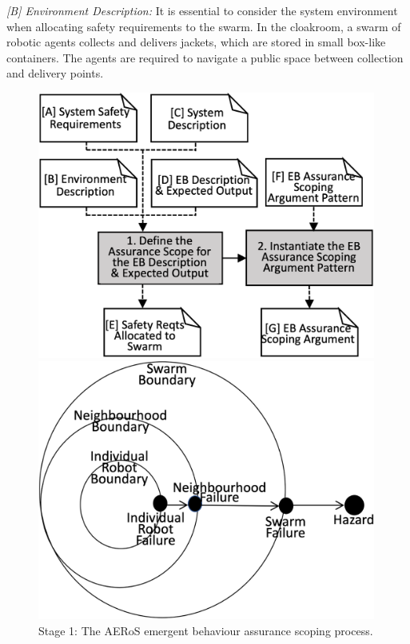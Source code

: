 \documentclass[runningheads]{llncs}
\begin{document}
\emph{[B] Environment Description:}
It is essential to consider the system environment when allocating safety requirements to the swarm. 
In the cloakroom, a swarm of robotic agents collects and delivers jackets, which are stored in small box-like containers. 
The agents are required to navigate a public space between collection and delivery points. 
\begin{figure}[!t]
	\centering
	\begin{minipage}[b]{.5\textwidth}
		\centering
		\includegraphics[width=0.99\textwidth]{figures/AERoS-Stage1.png}
		\vspace{-4ex}%
		\caption{Stage 1: The AERoS emergent behaviour assurance scoping process.}
		\label{amlas-a-stage1}
	\end{minipage}%
	\hspace*{.03\textwidth}
	\begin{minipage}[b]{.5\textwidth}
		\includegraphics[width=0.99\textwidth]{figures/stage1-failureevents-v3.png}

\end{minipage}
\end{figure}
\end{document}
